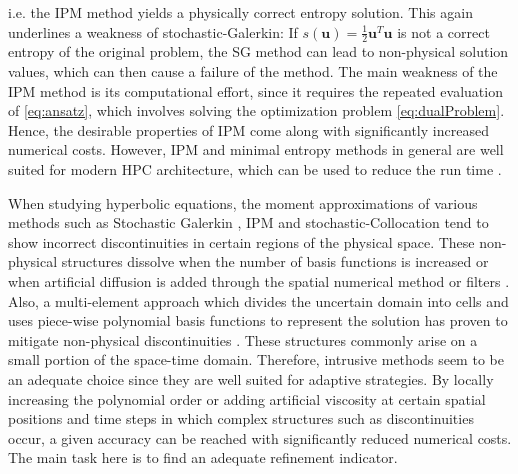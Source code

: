 i.e. the IPM method yields a physically correct entropy solution. This again underlines a weakness of stochastic-Galerkin: If $s(\bm{u}) = \frac{1}{2}\bm{u}^T\bm{u}$ is not a correct entropy of the original problem, the SG method can lead to non-physical solution values, which can then cause a failure of the method. The main weakness of the IPM method is its computational effort, since it requires the repeated evaluation of \eqref{eq:ansatz}, which involves solving the optimization problem \eqref{eq:dualProblem}. Hence, the desirable properties of IPM come along with significantly increased numerical costs. However, IPM and minimal entropy methods in general are well suited for modern HPC architecture, which can be used to reduce the run time \cite{garrett2015optimization}. 

When studying hyperbolic equations, the moment approximations of various methods such as Stochastic Galerkin \cite{le2004uncertainty}, IPM \cite{kusch2018filtered} and stochastic-Collocation \cite{barth2013non,dwight2013adaptive} tend to show incorrect discontinuities in certain regions of the physical space. These non-physical structures dissolve when the number of basis functions is increased \cite{pettersson2009numerical,offner2017stability} or when artificial diffusion is added through the spatial numerical method \cite{offner2017stability} or filters \cite{kusch2018filtered}. Also, a multi-element approach which divides the uncertain domain into cells and uses piece-wise polynomial basis functions to represent the solution has proven to mitigate non-physical discontinuities \cite{durrwachter2018hyperbolicity}. These structures commonly arise on a small portion of the space-time domain. Therefore, intrusive methods seem to be an adequate choice since they are well suited for adaptive strategies. By locally increasing the polynomial order \cite{tryoen2012adaptive,kroker2012finite,giesselmann2017posteriori} or adding artificial viscosity \cite{kusch2018filtered} at certain spatial positions and time steps in which complex structures such as discontinuities occur, a given accuracy can be reached with significantly reduced numerical costs. The main task here is to find an adequate refinement indicator. \\

